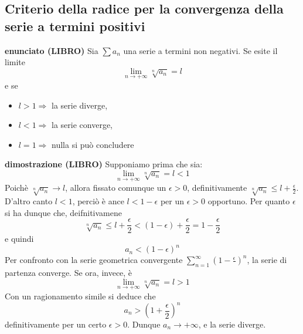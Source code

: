 \documentclass[a4paper, 9pt]{report}
\begin{document}
\subsection*{Criterio della radice per la convergenza della serie a termini positivi}
\textbf{enunciato (LIBRO)}\newline
Sia $\sum a_n$ una serie a termini non negativi. Se esite il limite
\[
    \lim_{n\rightarrow +\infty} \sqrt[n]{a_n} = l
\]
e se
\begin{itemize}
    \item $l>1 \Rightarrow $ la serie diverge,
    \item $l<1 \Rightarrow $ la serie converge,
    \item $l=1 \Rightarrow $ nulla si può concludere
\end{itemize}
\textbf{dimostrazione (LIBRO)}\newline
Supponiamo prima che sia:
\[
    \lim_{n\rightarrow +\infty} \sqrt[n]{a_n} = l < 1
\]
Poichè $\sqrt[n]{a_n} \rightarrow l$, allora fissato comunque un $\epsilon >0$, definitivamente $\sqrt[n]{a_n} \leq l + \frac{\epsilon}{2}$.\newline
D'altro canto $l<1$, perciò è ance $l<1-\epsilon$ per un $\epsilon > 0$ opportuno.\newline
Per quanto $\epsilon$ si ha dunque che, deifnitivamene
\[
    \sqrt[n]{a_n} \leq l + \frac{\epsilon}{2} < (1-\epsilon)+ \frac{\epsilon}{2} = 1 - \frac{\epsilon}{2}
\]
e quindi
\[
    a_n <\left(1-\epsilon\right)^n
\]
Per confronto con la serie geometrica convergente $\sum_{n=1}^{\infty}\left(1 - \frac{\epsilon}{}\right)^n$, la serie di partenza converge.\newline
Se ora, invece, è
\[
    \lim_{n\rightarrow +\infty}\sqrt[n]{a_n} = l > 1
\]
Con un ragionamento simile si deduce che 
\[
    a_n > \left(1 + \frac{\epsilon}{2}\right)^n
\]
definitivamente per un certo $\epsilon > 0$. Dunque $a_n \rightarrow +\infty$, e la serie diverge.





\newpage
\end{document}
